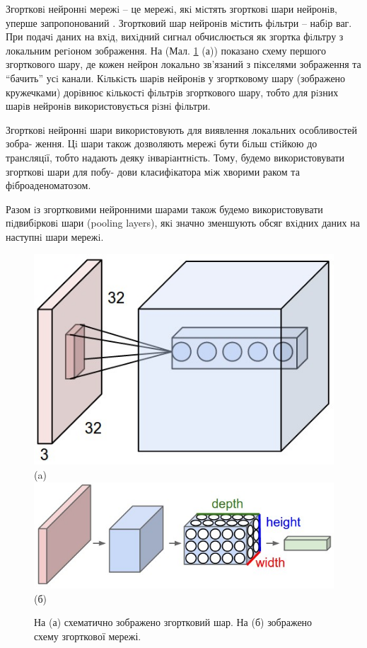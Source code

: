 Згортковi нейроннi мережi -- це мережi, якi мiстять згортковi шари нейронiв, уперше запропонований \parencite{nn:lecun_cnn}. Згортковий шар нейронiв мiстить фiльтри -- набiр ваг. При подачi даних на вхiд, вихiдний сигнал обчислюється як згортка фiльтру з локальним регiоном зображення. На (Мал. \ref{fig:convonet} (а)) показано схему першого згорткового шару, де кожен нейрон локально зв'язаний з пiкселями зображення та \enquote{бачить} усi канали. Кiлькiсть шарiв нейронiв у згортковому шару (зображено кружечками) дорiвнює кiлькостi фiльтрiв згорткового шару, тобто для рiзних шарiв нейронiв використовується рiзнi фiльтри.

Згортковi нейроннi шари використовують для виявлення локальних особливостей зобра- ження. Цi шари також дозволяють мережi бути бiльш стiйкою до трансляцiї, тобто надають деяку iнварiантнiсть. Тому, будемо використовувати згортковi шари для побу- дови класифiкатора мiж хворими раком та фiброаденоматозом.

Разом iз згортковими нейронними шарами також будемо використовувати пiдвибiрковi шари (pooling layers), якi значно зменшують обсяг вхiдних даних на наступнi шари мережi.

\begin{figure}[t!]
	\centering	
	\includegraphics[width=0.90\linewidth]{Figures/Chapter4/depthcol.jpeg}\\
	(a)
	\endminipage\hfill
	\centering	
	\includegraphics[width=0.90\linewidth]{Figures/Chapter4/cnn.jpeg}\\
	(б)
	\endminipage\hfill
	
	\caption{На (а) схематично зображено згортковий шар. На (б) зображено схему згорткової мережі.}
	\label{fig:convonet}
\end{figure}

